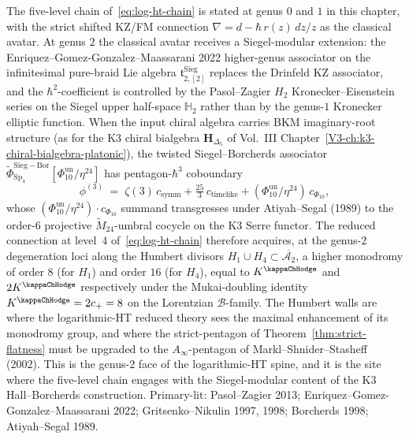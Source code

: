 \begin{remark}
\label{rem:genus2-siegel-borcherds-log-ht-extension}
The five-level chain of~\eqref{eq:log-ht-chain} is stated at genus $0$
and $1$ in this chapter, with the strict shifted KZ/FM connection
$\nabla = d - \hbar\,r(z)\,dz/z$ as the classical avatar. At genus $2$
the classical avatar receives a Siegel-modular extension: the
Enriquez--Gomez-Gonzalez--Maassarani 2022 higher-genus associator on
the infinitesimal pure-braid Lie algebra
$\mathfrak{t}^{\mathrm{Sieg}}_{2,[2]}$ replaces the Drinfeld KZ
associator, and the $\hbar^2$-coefficient is controlled by the
Pasol--Zagier $H_2$ Kronecker--Eisenstein series on the Siegel upper
half-space $\mathbb{H}_2$ rather than by the genus-$1$ Kronecker
elliptic function. When the input chiral algebra carries BKM
imaginary-root structure (as for the K3 chiral bialgebra
$\mathbf{H}_{\Delta_5}$ of Vol.~III
Chapter~\ref{V3-ch:k3-chiral-bialgebra-platonic}), the
twisted Siegel--Borcherds associator
$\widetilde{\Phi}^{\mathrm{Sieg-Bor}}_{\mathrm{Sp}_4}[\Phi_{10}^{\mathrm{un}}/\eta^{24}]$
has pentagon-$\hbar^3$ coboundary
\[
 \phi^{(3)}
 \;=\;
 \zeta(3)\,c_{\mathrm{symm}}
 + \tfrac{25}{3}\,c_{\mathrm{timelike}}
 + (\Phi_{10}^{\mathrm{un}}/\eta^{24})\,c_{\Phi_{10}},
\]
whose $(\Phi_{10}^{\mathrm{un}}/\eta^{24})\cdot c_{\Phi_{10}}$ summand transgresses
under Atiyah--Segal (1989) to the order-$6$ projective
$\widetilde{M}_{24}$-umbral cocycle on the K3 Serre functor. The
reduced connection at level~$4$ of~\eqref{eq:log-ht-chain} therefore
acquires, at the genus-$2$ degeneration loci along the Humbert
divisors $H_1\cup H_4 \subset \overline{\mathcal{A}_2}$, a higher
monodromy of order $8$ (for $H_1$) and order $16$ (for $H_4$),
equal to $K^{\kappaChHodge}$ and $2K^{\kappaChHodge}$
respectively under the Mukai-doubling identity
$K^{\kappaChHodge} = 2c_+ = 8$ on the Lorentzian
$\mathcal{B}$-family. The Humbert walls are where the
logarithmic-HT reduced theory sees the maximal enhancement of its
monodromy group, and where the strict-pentagon of
Theorem~\ref{thm:strict-flatness} must be upgraded to the
$A_\infty$-pentagon of Markl--Shnider--Stasheff (2002). This is the
genus-$2$ face of the logarithmic-HT spine, and it is
the site where the five-level chain engages with the Siegel-modular
content of the K3 Hall--Borcherds construction. Primary-lit:
Pasol--Zagier 2013; Enriquez--Gomez-Gonzalez--Maassarani 2022;
Gritsenko--Nikulin 1997, 1998; Borcherds 1998; Atiyah--Segal 1989.
\end{remark}

